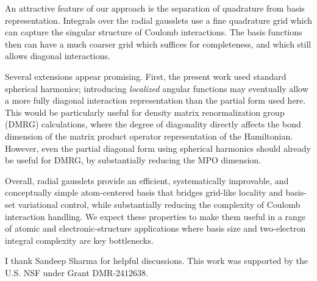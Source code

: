 \documentclass[aps,pra,reprint,longbibliography,nofootinbib]{revtex4-2}
\begin{document}
An attractive feature of our approach is the separation of quadrature from basis representation. Integrals over the radial gausslets use a fine quadrature grid which can capture the singular structure of Coulomb interactions. The basis functions then can have a much coarser grid which suffices for completeness, and which still allows diagonal interactions. 

Several extensions appear promising.  First, the present work used standard spherical harmonics; introducing \emph{localized} angular functions may eventually allow a more fully diagonal interaction representation than the partial form used here. This would be particularly useful for density matrix renormalization group (DMRG) calculations, where the degree of diagonality directly affects the bond dimension of the matrix product operator representation of the Hamiltonian. However, even the partial diagonal form using spherical harmonics should already be useful for DMRG, by substantially reducing the MPO dimension.

Overall, radial gausslets provide an efficient, systematically improvable, and conceptually simple atom-centered basis that bridges grid-like locality and basis-set variational control, while substantially reducing the complexity of Coulomb interaction handling.  We expect these properties to make them useful in a range of atomic and electronic-structure applications where basis size and two-electron integral complexity are key bottlenecks.




\acknowledgments
I thank Sandeep Sharma for helpful discussions. This work was supported by the U.S. NSF under Grant
DMR‑2412638. 



\end{document}
